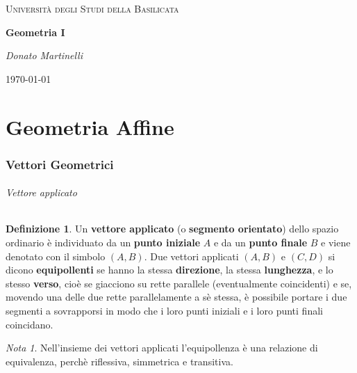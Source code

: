 \documentclass{article}
\theoremstyle{plain}
\theoremstyle{definition}
\newtheorem{defn}{Definizione}[section]
\theoremstyle{remark}
\newtheorem{note}{Nota}
\begin{document}
\begin{titlepage}
    \centering
	{\textsc{Università degli Studi della Basilicata} \par}
	\vspace{2cm}
    {\huge\bfseries Geometria I\par}
    \vfill
	{\Large\itshape Donato Martinelli\par}
	{\large \today\par}
\end{titlepage}

\tableofcontents

\newpage
\part{Geometria Affine}
\newpage

\section{Vettori Geometrici}
\vspace{20pt}

\paragraph{Vettore applicato}
\begin{bxthm}
\begin{defn}
    Un \textbf{vettore applicato} (o \textbf{segmento orientato}) dello spazio ordinario è individuato da un \textbf{punto iniziale} $A$ e da un \textbf{punto finale} $B$ e viene denotato con il simbolo $(A,B)$.
    Due vettori applicati $(A,B)$ e $(C,D)$ si dicono \textbf{equipollenti} se hanno la stessa \textbf{direzione}, la stessa \textbf{lunghezza}, e lo stesso \textbf{verso}, cioè se giacciono su rette parallele (eventualmente coincidenti) e se, movendo una delle due rette parallelamente a sè stessa, è possibile portare i due segmenti a sovrapporsi in modo che i loro punti iniziali e i loro punti finali coincidano.
\end{defn}
\end{bxthm}

\vspace{10pt}

\begin{note}
    Nell'insieme dei vettori applicati l'equipollenza è una relazione di equivalenza, perchè riflessiva, simmetrica e transitiva. 
\end{note}

\vspace{10pt}
\end{document}
